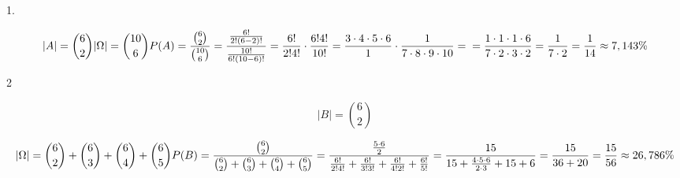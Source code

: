 \medskip
{} 
\medskip

1.

$$
|A| = {6\choose2}\\
|\Omega| = {10\choose 6}\\
P(A) = \frac{{6\choose2}}{{10\choose 6}} = \frac{\frac{6!}{2!(6-2)!}}{\frac{10!}{6!(10-6)!}}
= \frac{6!}{2!4!}\cdot\frac{6!4!}{10!} = \frac{3\cdot4\cdot5\cdot6}{1}\cdot\frac{1}{7\cdot8\cdot9\cdot10}=\\
=\frac{1\cdot1\cdot1\cdot6}{7\cdot2\cdot3\cdot2}=\frac{1}{7\cdot2}=\frac{1}{14}\approx7,143\%
$$

2

$$
|B|={6\choose2}
$$


$$
|\Omega|={6\choose2}+{6\choose3}+{6\choose4}+{6\choose5}\\
P(B) = \frac{{6\choose2}}{{6\choose2}+{6\choose3}+{6\choose4}+{6\choose5}}=
\frac{\frac{5\cdot6}{2}}{\frac{6!}{2!4!}+\frac{6!}{3!3!}+\frac{6!}{4!2!}+\frac{6!}{5!}}=\\
\frac{15}{15+\frac{4\cdot5\cdot6}{2\cdot3}+15+6}
=\frac{15}{36+20}=\frac{15}{56}\approx26,786\%
$$
